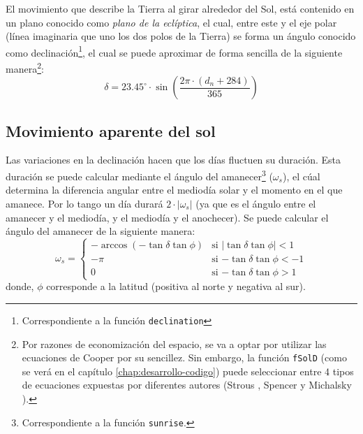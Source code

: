 El movimiento que describe la Tierra al girar alrededor del Sol, está contenido en un plano conocido como \emph{plano de la eclíptica}, el cual, entre este y el eje polar (línea imaginaria que uno los dos polos de la Tierra) se forma un ángulo conocido como declinación\footnote{Correspondiente a la función \texttt{declination}}, el cual se puede aproximar de forma sencilla de la siguiente manera\footnote{Por razones de economización del espacio, se va a optar por utilizar las ecuaciones de Cooper \cite{Cooper1969} por su sencillez. Sin embargo, la función \texttt{fSolD} (como se verá en el capítulo \ref{chap:desarrollo-codigo}) puede seleccionar entre 4 tipos de ecuaciones expuestas por diferentes autores (Strous \cite{Strous2011}, Spencer \cite{Spencer1971} y Michalsky \cite{Michalsky1988}).}: 
\begin{equation}
\delta=23.45^\circ \cdot \sin(\frac{2\pi \cdot (d_n+284)}{365})
\end{equation}

\subsection{Movimiento aparente del sol}
\label{sec:org67d8269}
Las variaciones en la declinación hacen que los días fluctuen su duración. Esta duración se puede calcular mediante el ángulo del amanecer\footnote{Correspondiente a la función \texttt{sunrise}.} (\(\omega_s\)), el cúal determina la diferencia angular entre el mediodía solar y el momento en el que amanece. Por lo tango un día durará \(2\cdot |\omega_s|\) (ya que es el ángulo entre el amanecer y el mediodía, y el mediodía y el anochecer). Se puede calcular el ángulo del amanecer de la siguiente manera: 
\begin{equation}
  \omega_s=\begin{cases}
  -\arccos(-\tan\delta\tan\phi)& \text{si $|\tan\delta\tan\phi|<1$}\\
  -\pi& \text{si $-\tan\delta\tan\phi<-1$}\\
  0& \text{si $-\tan\delta\tan\phi>1$}
  \end{cases}
\end{equation}
donde, \(\phi\) corresponde a la latitud (positiva al norte y negativa al sur). 

